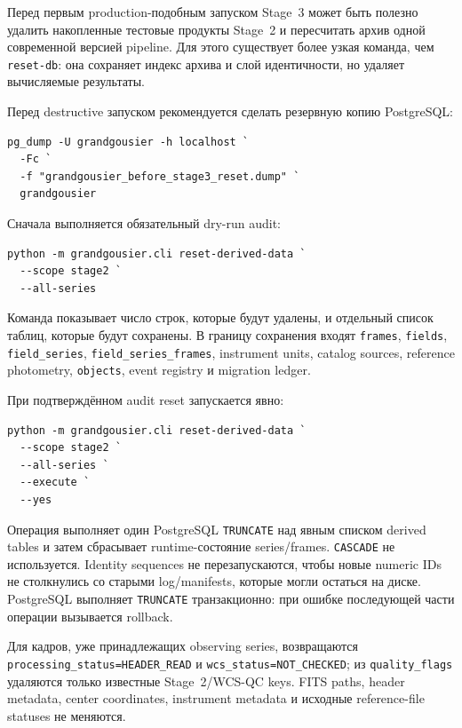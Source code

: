 Перед первым production-подобным запуском Stage~3 может быть полезно удалить накопленные тестовые продукты Stage~2 и пересчитать архив одной современной версией pipeline. Для этого существует более узкая команда, чем \texttt{reset-db}: она сохраняет индекс архива и слой идентичности, но удаляет вычисляемые результаты.

Перед destructive запуском рекомендуется сделать резервную копию PostgreSQL:

\begin{lstlisting}
pg_dump -U grandgousier -h localhost `
  -Fc `
  -f "grandgousier_before_stage3_reset.dump" `
  grandgousier
\end{lstlisting}

Сначала выполняется обязательный dry-run audit:

\begin{lstlisting}
python -m grandgousier.cli reset-derived-data `
  --scope stage2 `
  --all-series
\end{lstlisting}

Команда показывает число строк, которые будут удалены, и отдельный список таблиц, которые будут сохранены. В границу сохранения входят \texttt{frames}, \texttt{fields}, \texttt{field\_series}, \texttt{field\_series\_frames}, instrument units, catalog sources, reference photometry, \texttt{objects}, event registry и migration ledger.

При подтверждённом audit reset запускается явно:

\begin{lstlisting}
python -m grandgousier.cli reset-derived-data `
  --scope stage2 `
  --all-series `
  --execute `
  --yes
\end{lstlisting}

Операция выполняет один PostgreSQL \texttt{TRUNCATE} над явным списком derived tables и затем сбрасывает runtime-состояние series/frames. \texttt{CASCADE} не используется. Identity sequences не перезапускаются, чтобы новые numeric IDs не столкнулись со старыми log/manifests, которые могли остаться на диске. PostgreSQL выполняет \texttt{TRUNCATE} транзакционно: при ошибке последующей части операции вызывается rollback.

Для кадров, уже принадлежащих observing series, возвращаются \texttt{processing\_status=HEADER\_READ} и \texttt{wcs\_status=NOT\_CHECKED}; из \texttt{quality\_flags} удаляются только известные Stage~2/WCS-QC keys. FITS paths, header metadata, center coordinates, instrument metadata и исходные reference-file statuses не меняются.

